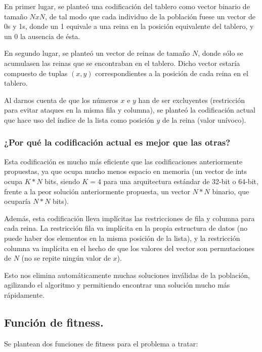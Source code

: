 \documentclass[12pt]{article}
\begin{document}
En primer lugar, se planteó una codificación del tablero como vector binario de tamaño $NxN$, de tal modo que cada individuo de la población fuese un vector de 0s y 1s, donde un 1 equivale a una reina en la posición equivalente del tablero, y un 0 la ausencia de ésta.

En segundo lugar, se planteó un vector de reinas de tamaño $N$, donde sólo se acumulasen las reinas que se encontraban en el tablero. Dicho vector estaría compuesto de tuplas $(x,y)$ correspondientes a la posición de cada reina en el tablero.

Al darnos cuenta de que los números $x$ e $y$ han de ser excluyentes (restricción para evitar ataques en la misma fila y columna), se planteó la codificación actual que hace uso del índice de la lista como posición $y$ de la reina (valor unívoco).

\subsubsection{¿Por qué la codificación actual es mejor que las otras?}

Esta codificación es mucho más eficiente que las codificaciones anteriormente propuestas, ya que ocupa mucho menos espacio en memoria (un vector de ints ocupa $K*N$ bits, siendo $K=4$ para una arquitectura estándar de 32-bit o 64-bit, frente a la peor solución anteriormente propuesta, un vector $N*N$ binario, que ocuparía $N*N$ bits).

Además, esta codificación lleva implícitas las restricciones de fila y columna para cada reina. La restricción fila va implícita en la propia estructura de datos (no puede haber dos elementos en la misma posición de la lista), y la restricción columna va implícita en el hecho de que los valores del vector son permutaciones de $N$ (no se repite ningún valor de $x$).

Esto nos elimina automáticamente muchas soluciones inválidas de la población, agilizando el algoritmo y permitiendo encontrar una solución mucho más rápidamente.

\subsection{Función de fitness.}

Se plantean dos funciones de fitness para el problema a tratar:
\end{document}

